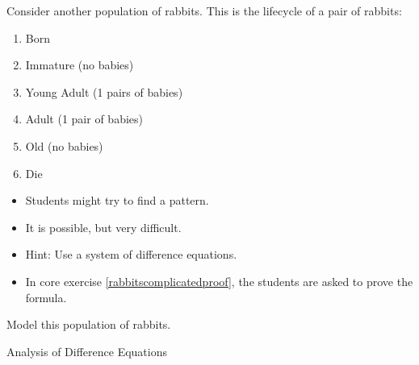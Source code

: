 \question
	Consider another population of rabbits. This is the lifecycle of a pair of rabbits:
	\begin{enumerate}[start=0,label=(year \arabic*)]
		\item Born
		\item Immature (no babies)
		\item Young Adult (1 pairs of babies)
		\item Adult (1 pair of babies)
		\item Old (no babies)
		\item Die
	\end{enumerate}	
\begin{annotation}
	\begin{goals}
		\begin{itemize}
			\item Students might try to find a pattern. 
			\item It is possible, but very difficult.
			\item Hint: Use a system of difference equations. 
			\item In core exercise \ref{rabbitscomplicatedproof}, the students are asked to prove the formula.
		\end{itemize}
	\end{goals}
\end{annotation}
	
	Model this population of rabbits.
	
	




\standardonlynewpage



%
%



\begin{module}{Analysis of Difference Equations}
	\label{diff:analysis}

	
	
\end{module}



